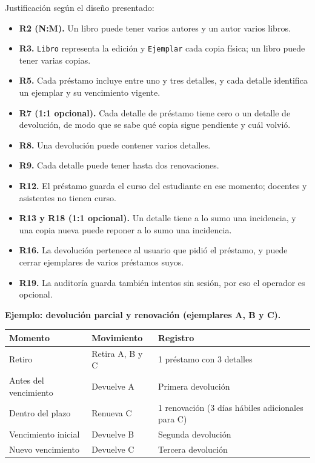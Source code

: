 \documentclass[11pt,a4paper]{article}
\begin{document}
Justificación según el diseño presentado:
\begin{itemize}[nosep]
\item \textbf{R2 (N:M).} Un libro puede tener varios autores y un autor varios libros.
\item \textbf{R3.} \texttt{Libro} representa la edición y \texttt{Ejemplar} cada copia física; un libro puede tener varias copias.
\item \textbf{R5.} Cada préstamo incluye entre uno y tres detalles, y cada detalle identifica un ejemplar y su vencimiento vigente.
\item \textbf{R7 (1:1 opcional).} Cada detalle de préstamo tiene cero o un detalle de devolución, de modo que se sabe qué copia sigue pendiente y cuál volvió.
\item \textbf{R8.} Una devolución puede contener varios detalles.
\item \textbf{R9.} Cada detalle puede tener hasta dos renovaciones.
\item \textbf{R12.} El préstamo guarda el curso del estudiante en ese momento; docentes y asistentes no tienen curso.
\item \textbf{R13 y R18 (1:1 opcional).} Un detalle tiene a lo sumo una incidencia, y una copia nueva puede reponer a lo sumo una incidencia.
\item \textbf{R16.} La devolución pertenece al usuario que pidió el préstamo, y puede cerrar ejemplares de varios préstamos suyos.
\item \textbf{R19.} La auditoría guarda también intentos sin sesión, por eso el operador es opcional.
\end{itemize}

\textbf{Ejemplo: devolución parcial y renovación (ejemplares A, B y C).}

\begin{tabularx}{\textwidth}{l l Y}
\toprule
\textbf{Momento} & \textbf{Movimiento} & \textbf{Registro}\\
\midrule
Retiro & Retira A, B y C & 1 préstamo con 3 detalles\\
Antes del vencimiento & Devuelve A & Primera devolución\\
Dentro del plazo & Renueva C & 1 renovación (3 días hábiles adicionales para C)\\
Vencimiento inicial & Devuelve B & Segunda devolución\\
Nuevo vencimiento & Devuelve C & Tercera devolución\\
\bottomrule
\end{tabularx}
\end{document}
